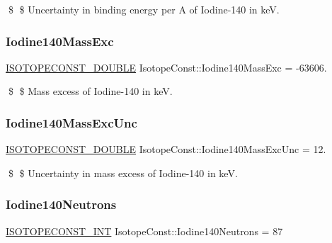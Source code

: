 \$ \$ Uncertainty in binding energy per A of Iodine-\/140 in keV. \mbox{\label{group___isotope_const-_iodine-_i140_ga552f3fae3eec0e5f8810e64d4e3ae8d8}} 
\subsubsection{\texorpdfstring{Iodine140\+Mass\+Exc}{Iodine140MassExc}}
{\footnotesize\ttfamily \mbox{\hyperlink{group___isotope_const-_macros_ga8f45a7272ce02c0b4c65c44636ed719a}{I\+S\+O\+T\+O\+P\+E\+C\+O\+N\+S\+T\+\_\+\+D\+O\+U\+B\+LE}} Isotope\+Const\+::\+Iodine140\+Mass\+Exc = -\/63606.}

\$ \$ Mass excess of Iodine-\/140 in keV. \mbox{\label{group___isotope_const-_iodine-_i140_ga4272b19403db72c1d254cc3bf7edae36}} 
\subsubsection{\texorpdfstring{Iodine140\+Mass\+Exc\+Unc}{Iodine140MassExcUnc}}
{\footnotesize\ttfamily \mbox{\hyperlink{group___isotope_const-_macros_ga8f45a7272ce02c0b4c65c44636ed719a}{I\+S\+O\+T\+O\+P\+E\+C\+O\+N\+S\+T\+\_\+\+D\+O\+U\+B\+LE}} Isotope\+Const\+::\+Iodine140\+Mass\+Exc\+Unc = 12.}

\$ \$ Uncertainty in mass excess of Iodine-\/140 in keV. \mbox{\label{group___isotope_const-_iodine-_i140_ga291c19140b2711ffe69b7a7dbc1dc839}} 
\subsubsection{\texorpdfstring{Iodine140\+Neutrons}{Iodine140Neutrons}}
{\footnotesize\ttfamily \mbox{\hyperlink{group___isotope_const-_macros_ga5f18360b3e99483a35c32d789e62621c}{I\+S\+O\+T\+O\+P\+E\+C\+O\+N\+S\+T\+\_\+\+I\+NT}} Isotope\+Const\+::\+Iodine140\+Neutrons = 87}

